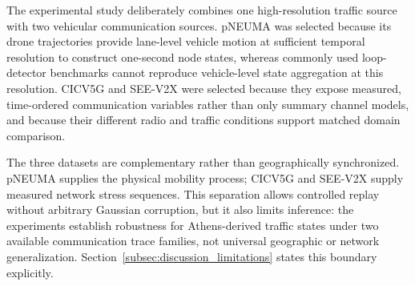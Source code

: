 \documentclass[pdflatex,sn-mathphys-num]{sn-jnl}%
\newenvironment{changed}{\color{blue}}{}
\theoremstyle{thmstyleone}%
\theoremstyle{thmstyletwo}%
\theoremstyle{thmstylethree}%
\begin{document}
\begin{changed}
The experimental study deliberately combines one high-resolution traffic source with two vehicular communication sources. pNEUMA was selected because its drone trajectories provide lane-level vehicle motion at sufficient temporal resolution to construct one-second node states, whereas commonly used loop-detector benchmarks cannot reproduce vehicle-level state aggregation at this resolution. CICV5G and SEE-V2X were selected because they expose measured, time-ordered communication variables rather than only summary channel models, and because their different radio and traffic conditions support matched domain comparison.

The three datasets are complementary rather than geographically synchronized. pNEUMA supplies the physical mobility process; CICV5G and SEE-V2X supply measured network stress sequences. This separation allows controlled replay without arbitrary Gaussian corruption, but it also limits inference: the experiments establish robustness for Athens-derived traffic states under two available communication trace families, not universal geographic or network generalization. Section~\ref{subsec:discussion_limitations} states this boundary explicitly.
\end{changed}
\end{document}
